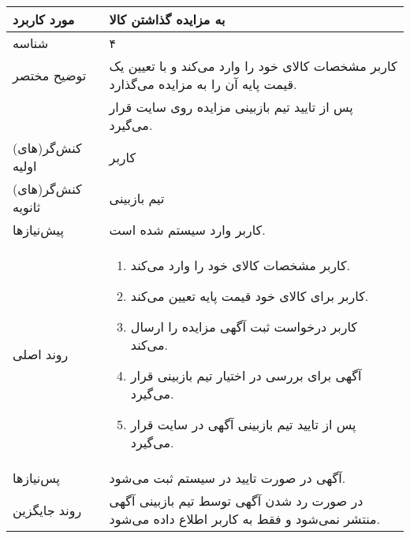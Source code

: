 \documentclass{article}
\begin{document}
\begin{center}
\begin{tabular} {|p{}|p{}|}
\hline
 مورد کاربرد & 
 به مزایده گذاشتن کالا
\\ \hline
 شناسه &
۴
\\ \hline
توضیح مختصر &
کاربر مشخصات کالای خود را وارد می‌کند و با تعیین یک قیمت پایه آن را به مزایده می‌گذارد.
\\
&
پس از تایید تیم بازبینی مزایده روی سایت قرار می‌گیرد.
\\ \hline
کنش‌گر(های) اولیه &
کاربر
\\ \hline
کنش‌گر(های) ثانویه &
تیم بازبینی
\\ \hline
پیش‌نیازها &
کاربر وارد سیستم شده است.
\\ \hline
روند اصلی &
\begin{enumerate}
\item
کاربر مشخصات کالای خود را وارد می‌کند.
\item
کاربر برای کالای خود قیمت پایه تعیین می‌کند.
\item
کاربر درخواست ثبت آگهی مزایده را ارسال می‌کند.
\item
آگهی برای بررسی در اختیار تیم بازبینی قرار می‌گیرد.
\item
پس از تایید تیم بازبینی آگهی در سایت قرار می‌گیرد.
\end{enumerate}
\\ \hline
پس‌نیازها &
آگهی در صورت تایید در سیستم ثبت می‌شود.
\\ \hline
روند جایگزین &
در صورت رد شدن آگهی توسط تیم بازبینی آگهی منتشر نمی‌شود و فقط به کاربر اطلاع داده می‌شود. 
\\ \hline
\end{tabular}
\end{center}

\newpage
\end{document}

